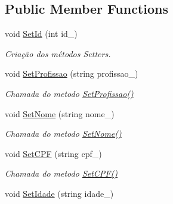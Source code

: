 \subsection*{Public Member Functions}
\begin{DoxyCompactItemize}
\item 
void \mbox{\hyperlink{class_veterinario_a1852e86bed8b254e2f9b49add597b5fb}{Set\+Id}} (int id\+\_\+)
\begin{DoxyCompactList}\small\item\em Criação dos métodos Setters. \end{DoxyCompactList}\item 
\mbox{\label{class_veterinario_a68be9e5f7903d1c3683e91ec3e4ea272}} 
void \mbox{\hyperlink{class_veterinario_a68be9e5f7903d1c3683e91ec3e4ea272}{Set\+Profissao}} (string profissao\+\_\+)
\begin{DoxyCompactList}\small\item\em Chamada do metodo \mbox{\hyperlink{class_veterinario_a68be9e5f7903d1c3683e91ec3e4ea272}{Set\+Profissao()}} \end{DoxyCompactList}\item 
\mbox{\label{class_veterinario_a4e153e6b5d2c869ace39958d69b9fa96}} 
void \mbox{\hyperlink{class_veterinario_a4e153e6b5d2c869ace39958d69b9fa96}{Set\+Nome}} (string nome\+\_\+)
\begin{DoxyCompactList}\small\item\em Chamada do metodo \mbox{\hyperlink{class_veterinario_a4e153e6b5d2c869ace39958d69b9fa96}{Set\+Nome()}} \end{DoxyCompactList}\item 
\mbox{\label{class_veterinario_a3d534f523d35ed98dfd86498a2cdb59b}} 
void \mbox{\hyperlink{class_veterinario_a3d534f523d35ed98dfd86498a2cdb59b}{Set\+C\+PF}} (string cpf\+\_\+)
\begin{DoxyCompactList}\small\item\em Chamada do metodo \mbox{\hyperlink{class_veterinario_a3d534f523d35ed98dfd86498a2cdb59b}{Set\+C\+P\+F()}} \end{DoxyCompactList}\item 
\mbox{\label{class_veterinario_ab77b4bda2c0785c8b696094a33f75f26}} 
void \mbox{\hyperlink{class_veterinario_ab77b4bda2c0785c8b696094a33f75f26}{Set\+Idade}} (string idade\+\_\+)

\end{DoxyCompactItemize}
